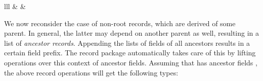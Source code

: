 \begin{isabellebody}
\begin{isamarkuptext}
  \begin{matharray}{lll}
     &  &  \\
  \end{matharray}

  \medskip We now reconsider the case of non-root records, which are
  derived of some parent.  In general, the latter may depend on
  another parent as well, resulting in a list of \emph{ancestor
  records}.  Appending the lists of fields of all ancestors results in
  a certain field prefix.  The record package automatically takes care
  of this by lifting operations over this context of ancestor fields.
  Assuming that  has ancestor
  fields ,
  the above record operations will get the following types:


\end{isamarkuptext}
\end{isabellebody}
